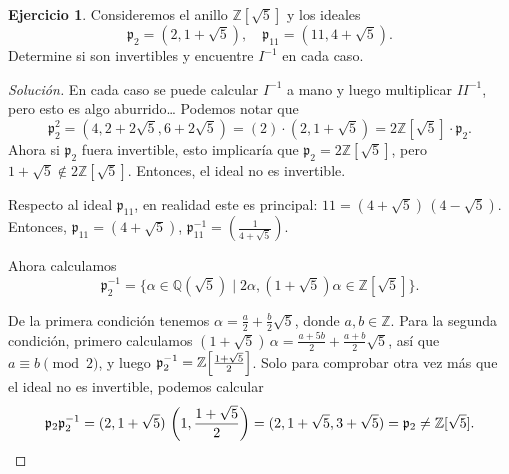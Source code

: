 \documentclass{article}
\newcounter{tarea}
\theoremstyle{definition}
\newtheorem{ejercicio}{Ejercicio}[tarea]
\newenvironment{solucion}{\begin{proof}[Solución]}{\end{proof}}
\newcommand{\ZZ}{\mathbb{Z}}
\newcommand{\QQ}{\mathbb{Q}}
\begin{document}
\begin{ejercicio}
  Consideremos el anillo $\mathbb{Z} [\sqrt{5}]$ y los ideales
  \[ \mathfrak{p}_2 = (2, 1 + \sqrt{5}), \quad
     \mathfrak{p}_{11} = (11, 4 + \sqrt{5}). \]
  Determine si son invertibles y encuentre $I^{-1}$ en cada caso.

  \ifdefined\solutions
  \begin{solucion}
    En cada caso se puede calcular $I^{-1}$ a mano y luego multiplicar
    $II^{-1}$, pero esto es algo aburrido\dots{} Podemos notar que
    \[ \mathfrak{p}_2^2 = (4, 2 + 2\sqrt{5}, 6 + 2\sqrt{5})
       = (2) \cdot (2, 1 + \sqrt{5}) = 2\ZZ[\sqrt{5}] \cdot \mathfrak{p}_2. \]
    Ahora si $\mathfrak{p}_2$ fuera invertible, esto implicaría que
    $\mathfrak{p}_2 = 2\ZZ[ \sqrt{5}]$, pero
    $1 + \sqrt{5} \notin 2\ZZ[\sqrt{5}]$. Entonces, el ideal no es invertible.
  
    Respecto al ideal $\mathfrak{p}_{11}$, en realidad este es principal:
    $11 = (4 + \sqrt{5})\,(4 - \sqrt{5})$.  Entonces,
    $\mathfrak{p}_{11} = (4 + \sqrt{5})$,
    $\mathfrak{p}_{11}^{-1} = \left(\frac{1}{4 + \sqrt{5}}\right)$.

    Ahora calculamos
    \[ \mathfrak{p}_2^{-1} = \{ \alpha \in \QQ(\sqrt{5}) \mid
       2\alpha, (1 + \sqrt{5}) \alpha \in \ZZ[\sqrt{5}] \}. \]

    De la primera condición tenemos
    $\alpha = \frac{a}{2} + \frac{b}{2}\sqrt{5}$, donde $a,b \in \ZZ$.
    Para la segunda condición, primero calculamos
    $(1 + \sqrt{5})\,\alpha = \frac{a + 5b}{2} + \frac{a + b}{2}\sqrt{5}$,
    así que $a \equiv b \pmod{2}$, y luego
    $\mathfrak{p}_2^{-1} = \ZZ\Bigl[\frac{1 + \sqrt{5}}{2}\Bigr]$.
    Solo para comprobar otra vez más que el ideal no es invertible, podemos
    calcular
    \[ \mathfrak{p}_2 \mathfrak{p}_2^{-1} =
       (2, 1 + \sqrt{5})\,\left(1, \frac{1 + \sqrt{5}}{2}\right) =
       (2, 1 + \sqrt{5}, 3 + \sqrt{5}) =
       \mathfrak{p}_2 \ne \ZZ[\sqrt{5}]. \qedhere \]
  \end{solucion}
  \fi
\end{ejercicio}
\end{document}
